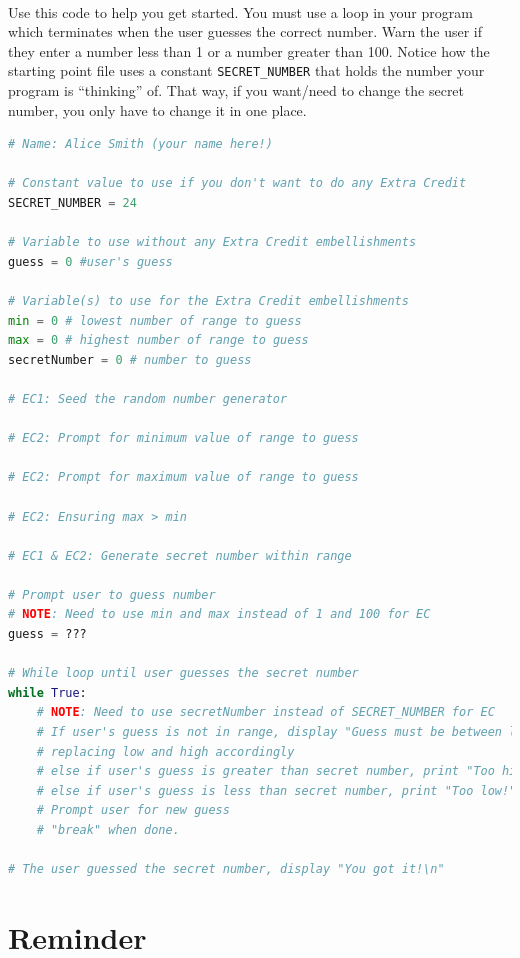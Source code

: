 \documentclass[letter,10pt]{article}
\begin{document}
    \paragraph{}Use this code to help you get started. You must use a loop in your program which terminates when the user guesses the correct number. Warn the user if they enter a number less than 1 or a number greater than 100. Notice how the starting point file uses a constant \texttt{SECRET\_NUMBER} that holds the number your program is ``thinking'' of. That way, if you want/need to change the secret number, you only have to change it in one place.
    \begin{lstlisting}[language=python]
# Name: Alice Smith (your name here!)

# Constant value to use if you don't want to do any Extra Credit
SECRET_NUMBER = 24

# Variable to use without any Extra Credit embellishments
guess = 0 #user's guess

# Variable(s) to use for the Extra Credit embellishments
min = 0 # lowest number of range to guess
max = 0 # highest number of range to guess
secretNumber = 0 # number to guess

# EC1: Seed the random number generator

# EC2: Prompt for minimum value of range to guess

# EC2: Prompt for maximum value of range to guess

# EC2: Ensuring max > min

# EC1 & EC2: Generate secret number within range

# Prompt user to guess number
# NOTE: Need to use min and max instead of 1 and 100 for EC
guess = ???

# While loop until user guesses the secret number
while True:
    # NOTE: Need to use secretNumber instead of SECRET_NUMBER for EC
    # If user's guess is not in range, display "Guess must be between low and high!",
    # replacing low and high accordingly
    # else if user's guess is greater than secret number, print "Too high!"
    # else if user's guess is less than secret number, print "Too low!"
    # Prompt user for new guess
    # "break" when done.

# The user guessed the secret number, display "You got it!\n"
    \end{lstlisting}

    \section*{Reminder}
\end{document}
